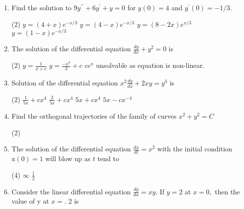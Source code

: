 \begin{enumerate}[label=\color{ocre}\textbf{\arabic*.}]
	\item Find the solution to $9 y^{\prime \prime}+6 y^{\prime}+y=0$ for $y(0)=4$ and $y^{\prime}(0)=-1 / 3$.
	\begin{tasks}(2)
		\task[\textbf{a.}]  $y=(4+x) e^{-x / 3}$ 
		\task[\textbf{b.}] $y=(4-x) e^{-x / 3}$
		\task[\textbf{c.}] $y=(8-2 x) e^{x / 3}$ 
		\task[\textbf{d.}] $y=(1-x) e^{-x / 3}$
	\end{tasks}
	\item The solution of the differential equation $\frac{d y}{d x}+y^{2}=0$ is
	\begin{tasks}(2)
		\task[\textbf{a.}]  $y=\frac{1}{x+c}$ 
		\task[\textbf{b.}]$y=\frac{-x^{3}}{3}+c$
		\task[\textbf{c.}]$c e^{x}$ 
		\task[\textbf{d.}]unsolvable as equation is non-linear. 
	\end{tasks}
	\item Solution of the differential equation $x^{2} \frac{d y}{d x}+2 x y=y^{3}$ is
	\begin{tasks}(2)
		\task[\textbf{a.}] $\frac{1}{5 x}+c x^{4}$ 
		\task[\textbf{b.}]$ \frac{2}{5 x}+c x^{4} $ 
		\task[\textbf{c.}]$5 x+c x^{4} $  
		\task[\textbf{d.}]$5 x-c x^{-4}$ 
	\end{tasks}
	\item Find the orthogonal trajectories of the family of curves $x^{2}+y^{2}=C$
	\begin{tasks}(2)
		
	\end{tasks}
	\item  The solution of the differential equation $\frac{d x}{d t}=x^{2}$ with the initial condition $\mathrm{x}(0)=1$ will blow up as $t$ tend to
	\begin{tasks}(4)
		\task[\textbf{a.}]$\infty$ 
		\task[\textbf{c.}]$\frac{1}{2}$ 
	\end{tasks}
	\item  Consider the linear differential equation $\frac{d y}{d x}=x y .$ If $y=2$ at $x=0,$ then the value of y at $x=$. 2 is
	

\end{enumerate}

